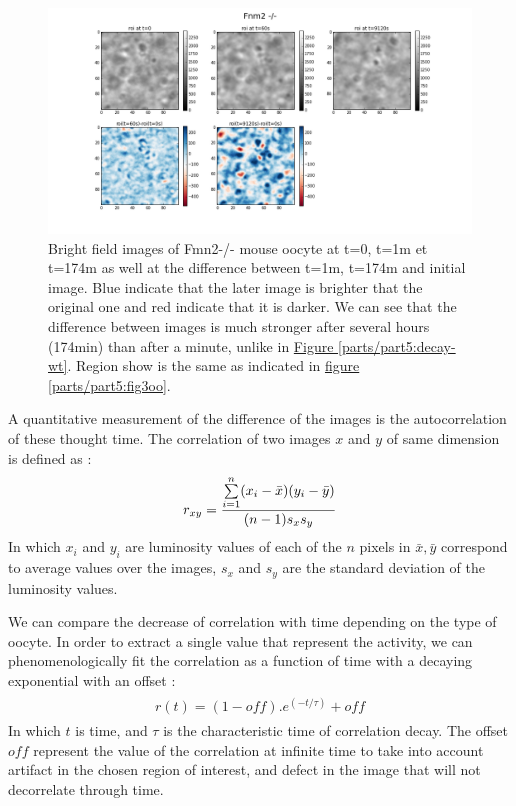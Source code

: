 \documentclass[A4paperpaper,11pt,english]{sphinxmanual}
\begin{document}
\begin{figure}[htbp]
\centering
\capstart

\includegraphics[width=0.700\linewidth]{decay-fmn2.png}
\caption{Bright field images of Fmn2-/- mouse oocyte at t=0, t=1m et t=174m as well
at the difference between t=1m, t=174m and initial image. Blue indicate
that the later image is brighter that the original one and red indicate
that it is darker.  We can see that the difference between images is much
stronger after several hours (174min) than after a minute, unlike
in \hyperref[parts/part5:decay-wt]{Figure  \ref*{parts/part5:decay-wt}}. Region show is the same as indicated in \hyperref[parts/part5:fig3oo]{figure  \ref*{parts/part5:fig3oo}}.}\label{parts/part5:decay-fmn2}\end{figure}

A quantitative measurement of the difference of the images is the
autocorrelation of these thought time. The correlation of two images \(x\)
and \(y\) of same dimension is defined as :
\begin{gather}
\begin{split}r_{xy}=\frac{\sum\limits_{i=1}^n (x_i-\bar{x})(y_i-\bar{y})}{(n-1) s_x s_y}\end{split}\notag
\end{gather}
In which \(x_i\) and \(y_i\) are luminosity values of each of the
\(n\) pixels in \(\bar{x},\bar{y}\) correspond to average values over
the images, \(s_x\) and \(s_y\) are the standard deviation of the
luminosity values.

We can compare the decrease of correlation with time depending on the type of
oocyte. In order to extract a single value that represent the activity, we can phenomenologically fit the correlation as a function of time with a decaying exponential with an offset :
\label{parts/part5:equation-edecay}\begin{gather}
\begin{split}r(t) = (1-off).e^{(-t/\tau)}+off\end{split}\label{parts/part5-edecay}
\end{gather}
In which \(t\) is time, and \(\tau\) is the characteristic time of
correlation decay. The offset  \(off\) represent the value of the
correlation at infinite time to take into account artifact in the chosen region
of interest, and defect in the image that will not decorrelate through time.
\end{document}
